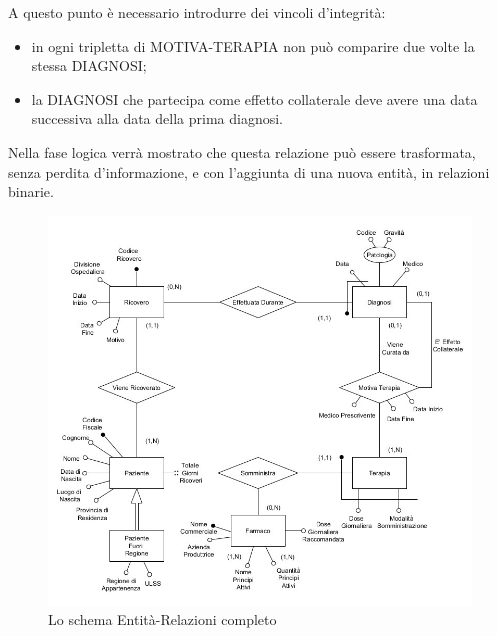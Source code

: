 \documentclass{article}
\begin{document}
A questo punto è necessario introdurre dei vincoli d'integrità:
\begin{itemize}
  \item in ogni tripletta di MOTIVA-TERAPIA non può comparire due volte la
    stessa DIAGNOSI;
  \item la DIAGNOSI che partecipa come effetto collaterale deve avere una data
    successiva alla data della prima diagnosi.
\end{itemize}
Nella fase logica verrà mostrato che questa relazione può essere trasformata,
senza perdita d'informazione, e con l'aggiunta di una nuova entità, in
relazioni binarie.


\begin{figure}[H] %
    \centering
    \includegraphics[width=\linewidth]{schema1}
    \caption{Lo schema Entità-Relazioni completo}
    \label{fig:ER_progettazione_modello}
\end{figure}
\end{document}
